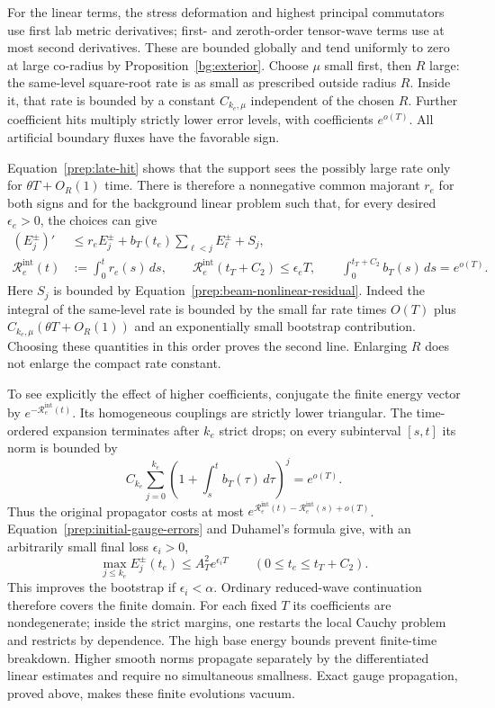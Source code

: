 For the linear terms, the stress deformation and highest principal
commutators use first lab metric derivatives; first- and zeroth-order
tensor-wave terms use at most second derivatives.  These are bounded
globally and tend uniformly to zero at large co-radius by
Proposition~\ref{bg:exterior}.  Choose $\mu$ small first, then $R$
large: the same-level square-root rate is as small as prescribed
outside radius $R$.  Inside it, that rate is bounded by a constant
$C_{k_e,\mu}$ independent of the chosen $R$.  Further coefficient
hits multiply strictly lower error levels, with coefficients
$e^{o(T)}$.  All artificial boundary fluxes have the favorable sign.

Equation~\eqref{prep:late-hit} shows that the support sees the
possibly large rate only for $\theta T+O_R(1)$ time.  There is
therefore a nonnegative common majorant $r_e$ for both signs and
for the background linear problem such that, for every desired
$\epsilon_e>0$, the choices can give
\begin{equation}\label{prep:exterior-rate}
 \begin{split}
 (E_j^\pm)'&\le r_e E_j^\pm
       +b_T(t_e)\sum_{\ell<j}E_\ell^\pm+S_j,\\
 \mathcal R_e^{\mathrm{int}}(t)&:=\int_0^t r_e(s)\,ds,
 \qquad \mathcal R_e^{\mathrm{int}}(t_T+C_2)\le\epsilon_eT,
 \qquad \int_0^{t_T+C_2}b_T(s)\,ds=e^{o(T)}.
 \end{split}
\end{equation}
Here $S_j$ is bounded by Equation~\eqref{prep:beam-nonlinear-residual}.
Indeed the integral of the same-level rate is bounded by the small
far rate times $O(T)$ plus
$C_{k_e,\mu}(\theta T+O_R(1))$ and an exponentially small
bootstrap contribution.  Choosing these quantities in this order
proves the second line.  Enlarging $R$ does not enlarge the compact
rate constant.

To see explicitly the effect of higher coefficients, conjugate the
finite energy vector by $e^{-\mathcal R_e^{\mathrm{int}}(t)}$.
Its homogeneous couplings are strictly lower triangular.  The
time-ordered expansion terminates after $k_e$ strict drops; on
every subinterval $[s,t]$ its norm is bounded by
\[
 C_{k_e}\sum_{j=0}^{k_e}
       \left(1+\int_s^t b_T(\tau)\,d\tau\right)^j=e^{o(T)}.
\]
Thus the original propagator costs at most
$e^{\mathcal R_e^{\mathrm{int}}(t)-\mathcal R_e^{\mathrm{int}}(s)+o(T)}$.
Equation~\eqref{prep:initial-gauge-errors} and Duhamel's formula
give, with an arbitrarily small final loss $\epsilon_i>0$,
\begin{equation}\label{prep:individual-exterior}
 \max_{j\le k_e}E_j^\pm(t_e)\le A_T^2e^{\epsilon_iT}
 \qquad (0\le t_e\le t_T+C_2).
\end{equation}
This improves the bootstrap if $\epsilon_i<\alpha$.
Ordinary reduced-wave continuation therefore covers the finite
domain.  For each fixed $T$ its coefficients are nondegenerate;
inside the strict margins, one restarts the local Cauchy problem
and restricts by dependence.  The high base energy bounds prevent
finite-time breakdown.  Higher smooth norms propagate separately
by the differentiated linear estimates and require no simultaneous
smallness.  Exact gauge propagation, proved above, makes these
finite evolutions vacuum.

